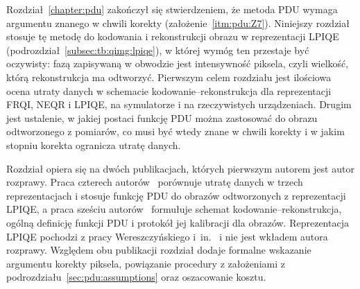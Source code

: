 Rozdział~\ref{chapter:pdu} zakończył się stwierdzeniem, że metoda PDU wymaga argumentu znanego w chwili korekty (założenie~\ref{itm:pdu:Z7}).
Niniejszy rozdział stosuje tę metodę do kodowania i rekonstrukcji obrazu w reprezentacji LPIQE (podrozdział~\ref{subsec:tb:qimg:lpiqe}), w której wymóg ten przestaje być oczywisty: fazą zapisywaną w obwodzie jest intensywność piksela, czyli wielkość, którą rekonstrukcja ma odtworzyć.
Pierwszym celem rozdziału jest ilościowa ocena utraty danych w schemacie kodowanie--rekonstrukcja dla reprezentacji FRQI, NEQR i LPIQE, na symulatorze i na rzeczywistych urządzeniach.
Drugim jest ustalenie, w jakiej postaci funkcję PDU można zastosować do obrazu odtworzonego z pomiarów, co musi być wtedy znane w chwili korekty i w jakim stopniu korekta ogranicza utratę danych.

Rozdział opiera się na dwóch publikacjach, których pierwszym autorem jest autor rozprawy.
Praca czterech autorów~\cite{werner_data_loss_2023} porównuje utratę danych w trzech reprezentacjach i stosuje funkcję PDU do obrazów odtworzonych z reprezentacji LPIQE, a praca sześciu autorów~\cite{werner_error_reduction_2025} formułuje schemat kodowanie--rekonstrukcja, ogólną definicję funkcji PDU i protokół jej kalibracji dla obrazów.
Reprezentacja LPIQE pochodzi z pracy Wereszczyńskiego i~in.~\cite{wereszczynski_cosine_2020} i nie jest wkładem autora rozprawy.
Względem obu publikacji rozdział dodaje formalne wskazanie argumentu korekty piksela, powiązanie procedury z założeniami z podrozdziału~\ref{sec:pdu:assumptions} oraz oszacowanie kosztu.

